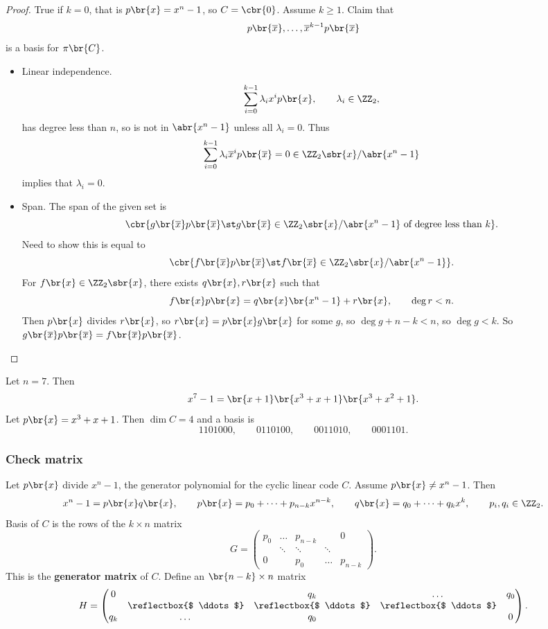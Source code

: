\begin{proof}
True if $ k = 0 $, that is $ p\br{x} = x^n - 1 $, so $ C = \cbr{0} $. Assume $ k \ge 1 $. Claim that
$$ p\br{\overline{x}}, \dots, \overline{x}^{k - 1}p\br{\overline{x}} $$
is a basis for $ \pi\br{C} $.

\pagebreak

\begin{itemize}
\item Linear independence.
$$ \sum_{i = 0}^{k - 1} \lambda_ix^ip\br{x}, \qquad \lambda_i \in \ZZ_2, $$
has degree less than $ n $, so is not in $ \abr{x^n - 1} $ unless all $ \lambda_i = 0 $. Thus
$$ \sum_{i = 0}^{k - 1} \lambda_i\overline{x}^ip\br{\overline{x}} = 0 \in \ZZ_2\sbr{x} / \abr{x^n - 1} $$
implies that $ \lambda_i = 0 $.
\item Span. The span of the given set is
$$ \cbr{g\br{\overline{x}}p\br{\overline{x}} \st g\br{\overline{x}} \in \ZZ_2\sbr{x} / \abr{x^n - 1} \ \text{of degree less than} \ k}. $$
Need to show this is equal to
$$ \cbr{f\br{\overline{x}}p\br{\overline{x}} \st f\br{\overline{x}} \in \ZZ_2\sbr{x} / \abr{x^n - 1}}. $$
For $ f\br{x} \in \ZZ_2\sbr{x} $, there exists $ q\br{x}, r\br{x} $ such that
$$ f\br{x}p\br{x} = q\br{x}\br{x^n - 1} + r\br{x}, \qquad \deg r < n. $$
Then $ p\br{x} $ divides $ r\br{x} $, so $ r\br{x} = p\br{x}g\br{x} $ for some $ g $, so $ \deg g + n - k < n $, so $ \deg g < k $. So $ g\br{\overline{x}}p\br{\overline{x}} = f\br{\overline{x}}p\br{\overline{x}} $.
\end{itemize}
\end{proof}

\begin{example*}
Let $ n = 7 $. Then
$$ x^7 - 1 = \br{x + 1}\br{x^3 + x + 1}\br{x^3 + x^2 + 1}. $$
Let $ p\br{x} = x^3 + x + 1 $. Then $ \dim C = 4 $ and a basis is
$$ 1101000, \qquad 0110100, \qquad 0011010, \qquad 0001101. $$
\end{example*}

\subsubsection{Check matrix}

Let $ p\br{x} $ divide $ x^n - 1 $, the generator polynomial for the cyclic linear code $ C $. Assume $ p\br{x} \ne x^n - 1 $. Then
$$ x^n - 1 = p\br{x}q\br{x}, \qquad p\br{x} = p_0 + \dots + p_{n - k}x^{n - k}, \qquad q\br{x} = q_0 + \dots + q_kx^k, \qquad p_i, q_i \in \ZZ_2. $$
Basis of $ C $ is the rows of the $ k \times n $ matrix
$$ G =
\begin{pmatrix}
p_0 & \dots & p_{n - k} & & 0 \\
& \ddots & \ddots & \ddots & \\
0 & & p_0 & \dots & p_{n - k}
\end{pmatrix}.
$$
This is the \textbf{generator matrix} of $ C $. Define an $ \br{n - k} \times n $ matrix
$$ H =
\begin{pmatrix}
0 & & q_k & \dots & q_0 \\
& \reflectbox{$ \ddots $} & \reflectbox{$ \ddots $} & \reflectbox{$ \ddots $} & \\
q_k & \dots & q_0 & & 0
\end{pmatrix}.
$$

